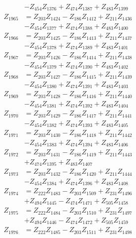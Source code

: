 \begin{multicols}{2}
\begin{align}
&- Z_{454}Z_{1376} + Z_{474}Z_{1387} + Z_{483}Z_{1399} \nonumber \\
Z_{1965} &= Z_{203}Z_{1424} - Z_{186}Z_{1412} + Z_{211}Z_{1436}  \nonumber \\
&- Z_{454}Z_{1377} + Z_{474}Z_{1388} + Z_{483}Z_{1400} \nonumber \\
Z_{1966} &= Z_{203}Z_{1425} - Z_{186}Z_{1413} + Z_{211}Z_{1437}  \nonumber \\
&- Z_{454}Z_{1378} + Z_{474}Z_{1389} + Z_{483}Z_{1401} \nonumber \\
Z_{1967} &= Z_{203}Z_{1426} - Z_{186}Z_{1414} + Z_{211}Z_{1438}  \nonumber \\
&- Z_{454}Z_{1379} + Z_{474}Z_{1390} + Z_{483}Z_{1402} \nonumber \\
Z_{1968} &= Z_{203}Z_{1427} - Z_{186}Z_{1415} + Z_{211}Z_{1439}  \nonumber \\
&- Z_{454}Z_{1380} + Z_{474}Z_{1391} + Z_{483}Z_{1403} \nonumber \\
Z_{1969} &= Z_{203}Z_{1428} - Z_{186}Z_{1416} + Z_{211}Z_{1440}  \nonumber \\
&- Z_{454}Z_{1381} + Z_{474}Z_{1392} + Z_{483}Z_{1404} \nonumber \\
Z_{1970} &= Z_{203}Z_{1429} - Z_{186}Z_{1417} + Z_{211}Z_{1441}  \nonumber \\
&- Z_{454}Z_{1382} + Z_{474}Z_{1393} + Z_{483}Z_{1405} \nonumber \\
Z_{1971} &= Z_{203}Z_{1430} - Z_{186}Z_{1418} + Z_{211}Z_{1442}  \nonumber \\
&- Z_{454}Z_{1383} + Z_{474}Z_{1394} + Z_{483}Z_{1406} \nonumber \\
Z_{1972} &= Z_{203}Z_{1431} - Z_{186}Z_{1419} + Z_{211}Z_{1443}  \nonumber \\
&+ Z_{474}Z_{1395} + Z_{483}Z_{1407} \nonumber \\
Z_{1973} &= Z_{203}Z_{1432} - Z_{186}Z_{1420} + Z_{211}Z_{1444}  \nonumber \\
&- Z_{454}Z_{1384} + Z_{474}Z_{1396} + Z_{483}Z_{1408} \nonumber \\
Z_{1974} &= Z_{222}Z_{1483} - Z_{203}Z_{1509} + Z_{231}Z_{1496}  \nonumber \\
&+ Z_{494}Z_{1445} - Z_{474}Z_{1471} + Z_{505}Z_{1458} \nonumber \\
Z_{1975} &= Z_{222}Z_{1484} - Z_{203}Z_{1510} + Z_{231}Z_{1497}  \nonumber \\
&+ Z_{494}Z_{1446} - Z_{474}Z_{1472} + Z_{505}Z_{1459} \nonumber \\
Z_{1976} &= Z_{222}Z_{1485} - Z_{203}Z_{1511} + Z_{231}Z_{1498}  \nonumber \\

\end{align}
\end{multicols}
